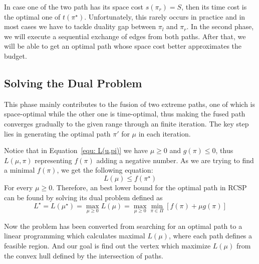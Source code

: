 \documentclass{sig-alternate-05-2015}
\begin{document}
In case one of the two path has its space cost $ s(\pi_r) = S $, then its time cost is the optimal one of $ t(\pi^\star) $.
Unfortunately, this rarely occurs in practice and in most cases we have to tackle duality gap between $ \pi_l $ and $ \pi_r $.
In the second phase, we will execute a sequential exchange of edges from both paths.
After that, we will be able to get an optimal path whose space cost better approximates the budget.

\subsection{Solving the Dual Problem}
This phase mainly contributes to the fusion of two extreme paths, one of which is space-optimal while the other one is time-optimal, thus making the fused path converges gradually to the given range through an finite iteration.
The key step lies in generating the optimal path $ \pi' $ for $ \mu $ in each iteration.

Notice that in Equation~\eqref{equ: L(u,pi)} we have $ \mu \geqslant 0 $ and $ g(\pi) \leqslant 0 $, thus $ L(\mu,\pi) $ representing $ f(\pi) $ adding a negative number.
As we are trying to find a minimal $ f(\pi) $, we get the following equation:
\begin{equation}
L(\mu) \leqslant f(\pi^\star) \label{equ: maximum}
\end{equation}
\noindent For every $ \mu \geqslant 0 $.
Therefore, an best lower bound for the optimal path in RCSP can be found by solving its dual problem defined as 
\begin{equation}
L^\star = L(\mu^\star) = \max_{\mu \geqslant 0} L(\mu) =\max_{\mu \geqslant 0} \min_{\pi \in \Pi} \left[ f(\pi) + \mu g(\pi) \right]
\end{equation}

Now the problem has been converted from searching for an optimal path to a linear programming which calculates maximal $ L(\mu) $, where each path defines a feasible region.
And our goal is find out the vertex which maximize $ L(\mu) $ from the convex hull defined by the intersection of paths.
\end{document}
